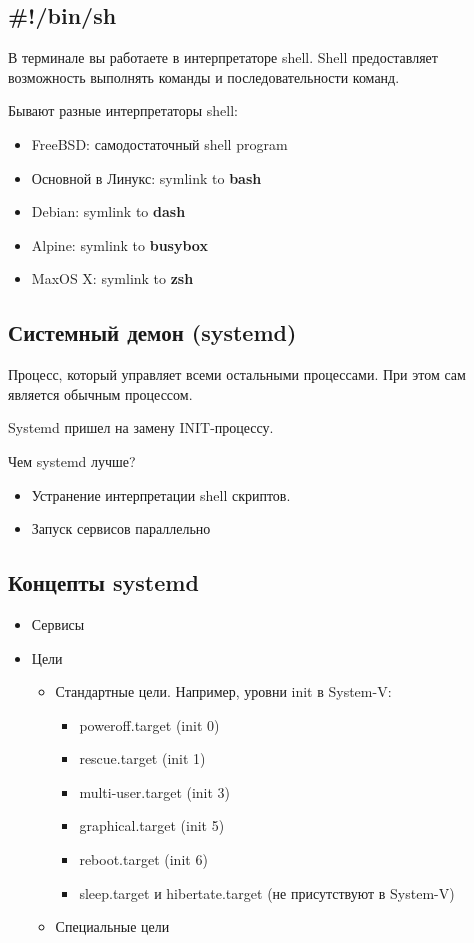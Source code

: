 \subsection{\#!/bin/sh}

В терминале вы работаете в интерпретаторе shell. Shell предоставляет возможность выполнять
команды и последовательности команд.

Бывают разные интерпретаторы shell:
\begin{itemize}
	\item FreeBSD: самодостаточный shell program
	\item Основной в Линукс: symlink to \textbf{bash}
	\item Debian: symlink to \textbf{dash}
	\item Alpine: symlink to \textbf{busybox}
	\item MaxOS X: symlink to \textbf{zsh}
\end{itemize}

\subsection{Системный демон (systemd)}

Процесс, который управляет всеми остальными процессами. При этом сам является
обычным процессом.

Systemd пришел на замену INIT-процессу.

Чем systemd лучше?
\begin{itemize}
	\item Устранение интерпретации shell скриптов. 
	\item Запуск сервисов параллельно
\end{itemize}

\subsection{Концепты systemd}

\begin{itemize}
	\item Сервисы
	\item Цели
		\begin{itemize}
			\item Стандартные цели. Например, уровни init в System-V:
				\begin{itemize}
					\item poweroff.target (init 0)
					\item rescue.target (init 1)
					\item multi-user.target (init 3)
					\item graphical.target (init 5)
					\item reboot.target (init 6)
					\item sleep.target и hibertate.target (не присутствуют в System-V)
				\end{itemize}
			\item Специальные цели
		\end{itemize}
\end{itemize}

